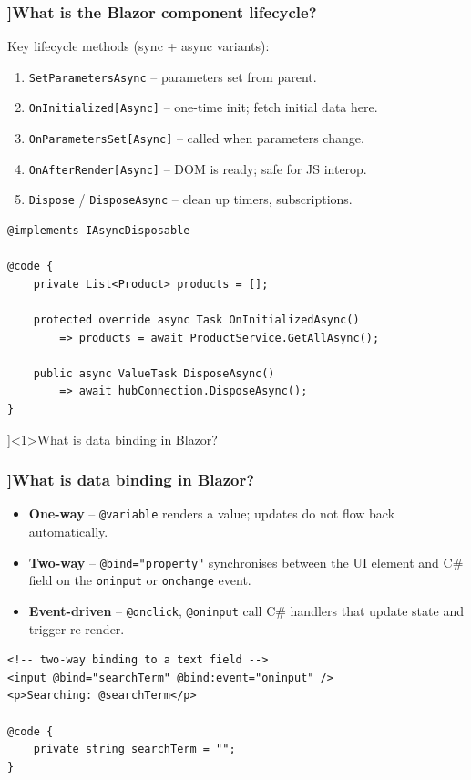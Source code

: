 \begin{frame}[fragile]
  \frametitle{\AnswerTitle[\CategoryBadge[BlazorColor!20]{Blazor Server}]{What is the Blazor component lifecycle?}}

  {\footnotesize
  Key lifecycle methods (sync + async variants):
  \begin{enumerate}
    \item \texttt{SetParametersAsync} – parameters set from parent.
    \item \texttt{OnInitialized[Async]} – one-time init; fetch initial data here.
    \item \texttt{OnParametersSet[Async]} – called when parameters change.
    \item \texttt{OnAfterRender[Async]} – DOM is ready; safe for JS interop.
    \item \texttt{Dispose} / \texttt{DisposeAsync} – clean up timers, subscriptions.
  \end{enumerate}
  }

  \begin{verbatim}
@implements IAsyncDisposable

@code {
    private List<Product> products = [];

    protected override async Task OnInitializedAsync()
        => products = await ProductService.GetAllAsync();

    public async ValueTask DisposeAsync()
        => await hubConnection.DisposeAsync();
}
  \end{verbatim}
\end{frame}

\QuestionSlide[\CategoryBadge[BlazorColor!20]{Blazor Server}]<1>{What is data binding in Blazor?}

\begin{frame}[fragile]
  \frametitle{\AnswerTitle[\CategoryBadge[BlazorColor!20]{Blazor Server}]{What is data binding in Blazor?}}

  {\footnotesize
  \begin{itemize}
    \item \textbf{One-way} – \texttt{@variable} renders a value; updates do not flow back automatically.
    \item \textbf{Two-way} – \texttt{@bind="property"} synchronises between the UI element and C\# field on the \texttt{oninput} or \texttt{onchange} event.
    \item \textbf{Event-driven} – \texttt{@onclick}, \texttt{@oninput} call C\# handlers that update state and trigger re-render.
  \end{itemize}
  }

  \begin{verbatim}
<!-- two-way binding to a text field -->
<input @bind="searchTerm" @bind:event="oninput" />
<p>Searching: @searchTerm</p>

@code {
    private string searchTerm = "";
}
  \end{verbatim}
\end{frame}

